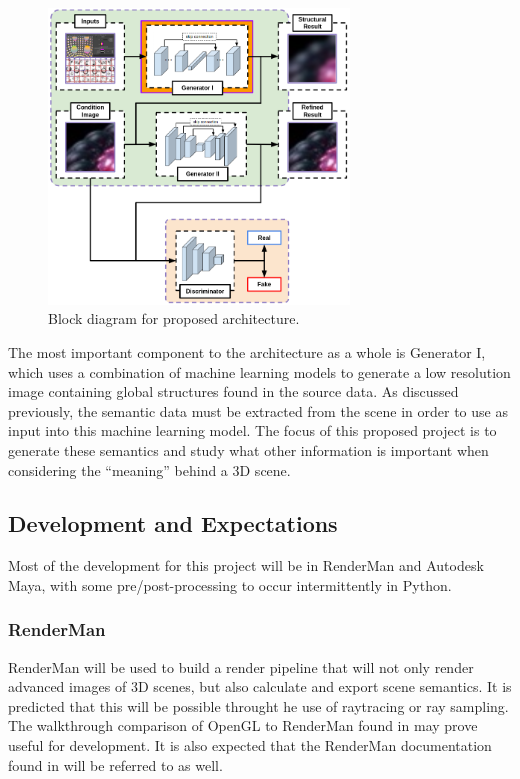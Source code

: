 \documentclass[conference]{IEEEtran}
\begin{document}
\begin{figure}[htbp]
\centerline{\includegraphics[width=8cm]{block_diagram.png}}
\caption{Block diagram for proposed architecture.}
\label{fig:block_diagram}
\end{figure}

The most important component to the architecture as a whole
is Generator I, which uses a combination of machine learning models to generate a
low resolution image containing global structures found in the
source data. As discussed previously, the semantic data must be extracted from
the scene in order to use as input into this machine learning model.
The focus of this proposed project is to generate these semantics and study
what other information is important when considering the
``meaning'' behind a 3D scene.

\subsection{Development and Expectations}
Most of the development for this project will be in RenderMan and Autodesk Maya,
with some pre/post-processing to occur intermittently in Python.

\subsubsection{RenderMan}
RenderMan will be used to build a render pipeline that will not only render advanced images
of 3D scenes, but also calculate and export scene semantics.
It is predicted that this will be possible throught he use of raytracing or ray sampling.
The walkthrough comparison of OpenGL to RenderMan found in \cite{renderman_opengl}
may prove useful for development.
It is also expected that the RenderMan documentation found in \cite{renderman_docs}
will be referred to as well.
\end{document}
